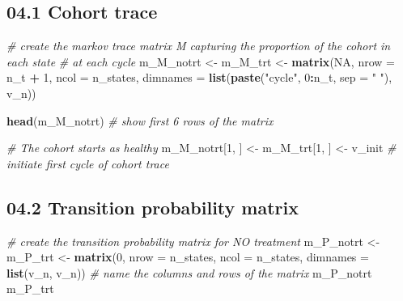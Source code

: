 \documentclass[
]{article}
\newenvironment{Shaded}{\begin{snugshade}}{\end{snugshade}}
\newcommand{\CommentTok}[1]{\textcolor[rgb]{0.56,0.35,0.01}{\textit{#1}}}
\newcommand{\DataTypeTok}[1]{\textcolor[rgb]{0.13,0.29,0.53}{#1}}
\newcommand{\DecValTok}[1]{\textcolor[rgb]{0.00,0.00,0.81}{#1}}
\newcommand{\KeywordTok}[1]{\textcolor[rgb]{0.13,0.29,0.53}{\textbf{#1}}}
\newcommand{\NormalTok}[1]{#1}
\newcommand{\OperatorTok}[1]{\textcolor[rgb]{0.81,0.36,0.00}{\textbf{#1}}}
\newcommand{\OtherTok}[1]{\textcolor[rgb]{0.56,0.35,0.01}{#1}}
\newcommand{\StringTok}[1]{\textcolor[rgb]{0.31,0.60,0.02}{#1}}
\begin{document}
\hypertarget{cohort-trace}{%
\subsection{04.1 Cohort trace}\label{cohort-trace}}

\begin{Shaded}
\begin{Highlighting}[]
\CommentTok{# create the markov trace matrix M capturing the proportion of the cohort in each state }
\CommentTok{# at each cycle}
\NormalTok{m_M_notrt <-}\StringTok{ }\NormalTok{m_M_trt <-}\StringTok{ }\KeywordTok{matrix}\NormalTok{(}\OtherTok{NA}\NormalTok{, }
                               \DataTypeTok{nrow     =}\NormalTok{ n_t }\OperatorTok{+}\StringTok{ }\DecValTok{1}\NormalTok{, }\DataTypeTok{ncol =}\NormalTok{ n_states,}
                               \DataTypeTok{dimnames =} \KeywordTok{list}\NormalTok{(}\KeywordTok{paste}\NormalTok{(}\StringTok{"cycle"}\NormalTok{, }\DecValTok{0}\OperatorTok{:}\NormalTok{n_t, }\DataTypeTok{sep =} \StringTok{" "}\NormalTok{), v_n))}

\KeywordTok{head}\NormalTok{(m_M_notrt) }\CommentTok{# show first 6 rows of the matrix }

\CommentTok{# The cohort starts as healthy}
\NormalTok{m_M_notrt[}\DecValTok{1}\NormalTok{, ] <-}\StringTok{ }\NormalTok{m_M_trt[}\DecValTok{1}\NormalTok{, ] <-}\StringTok{ }\NormalTok{v_init  }\CommentTok{# initiate first cycle of cohort trace }
\end{Highlighting}
\end{Shaded}

\hypertarget{transition-probability-matrix}{%
\subsection{04.2 Transition probability
matrix}\label{transition-probability-matrix}}

\begin{Shaded}
\begin{Highlighting}[]
\CommentTok{# create the transition probability matrix for NO treatment}
\NormalTok{m_P_notrt <-}\StringTok{ }\NormalTok{m_P_trt  <-}\StringTok{ }\KeywordTok{matrix}\NormalTok{(}\DecValTok{0}\NormalTok{,}
                                \DataTypeTok{nrow =}\NormalTok{ n_states,}
                                \DataTypeTok{ncol =}\NormalTok{ n_states,}
                                \DataTypeTok{dimnames =} \KeywordTok{list}\NormalTok{(v_n, v_n)) }\CommentTok{# name the columns and rows of the matrix}
\NormalTok{m_P_notrt}
\NormalTok{m_P_trt}
\end{Highlighting}
\end{Shaded}
\end{document}

